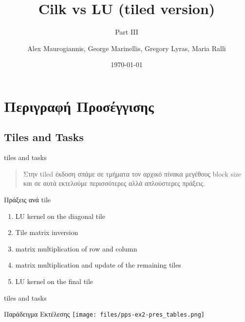 \documentclass{beamer}
\author[afein,fedjo,mastergreg,mariaral]{Alex Maurogiannis, George Marinellis, Gregory Lyras, Maria Ralli}
\institute{CSlab @ NTUA}
\title{Cilk vs LU (tiled version)}
\subtitle{Part III}
\date{\today}
\begin{document}
\begin{frame}
    \titlepage
\end{frame}

\section{Περιγραφή Προσέγγισης}
\subsection{Tiles and Tasks}
\begin{frame}{tiles and tasks}
    \begin{quote}
        Στην tiled έκδοση σπάμε σε τμήματα τον αρχικό πίνακα μεγέθους block size
        και σε αυτά εκτελούμε περισσότερες αλλά απλούστερες πράξεις.
    \end{quote}
    \pause

    \begin{block}{Πράξεις ανά tile}
        \begin{enumerate}
            \item<2-> LU kernel on the diagonal tile
            \item<3-> Tile matrix inversion
            \item<4-> matrix multiplication of row and column
            \item<5-> matrix multiplication and update of the remaining tiles
            \item<6-> LU kernel on the final tile
            
        \end{enumerate}
    \end{block}

\end{frame}

\begin{frame}{tiles and tasks}
    \begin{block}{Παράδειγμα Εκτέλεσης}
        \texttt{[image: files/pps-ex2-pres\_tables.png]}
    \end{block}
\end{frame}
\end{document}
